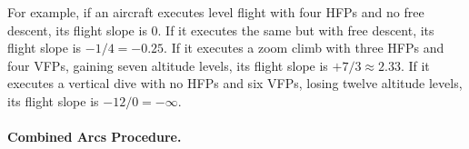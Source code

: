 {For example, if an aircraft executes level flight with four HFPs and no free descent, its flight slope is 0. If it executes the same but with free descent, its flight slope is $-1/4 = -0.25$. If it executes a zoom climb with three HFPs and four VFPs, gaining seven altitude levels, its flight slope is $+7/3 \approx 2.33$. If it executes a vertical dive with no HFPs and six VFPs, losing twelve altitude levels, its flight slope is $-12/0 = -\infty$.

\paragraph{Combined Arcs Procedure.}



%
%
%
%
%
}
